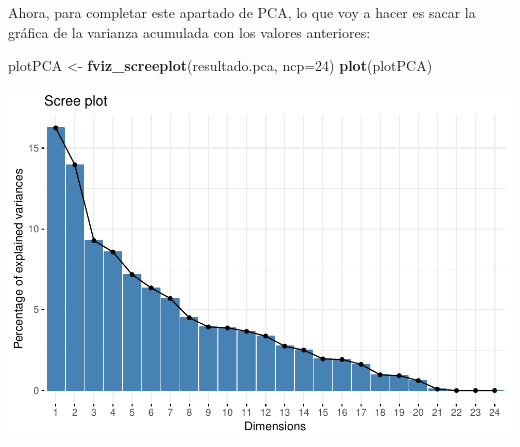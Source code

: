 \documentclass[]{article}
\newenvironment{Shaded}{\begin{snugshade}}{\end{snugshade}}
\newcommand{\CommentTok}[1]{\textcolor[rgb]{0.56,0.35,0.01}{\textit{#1}}}
\newcommand{\DataTypeTok}[1]{\textcolor[rgb]{0.13,0.29,0.53}{#1}}
\newcommand{\DecValTok}[1]{\textcolor[rgb]{0.00,0.00,0.81}{#1}}
\newcommand{\KeywordTok}[1]{\textcolor[rgb]{0.13,0.29,0.53}{\textbf{#1}}}
\newcommand{\NormalTok}[1]{#1}
\newcommand{\OtherTok}[1]{\textcolor[rgb]{0.56,0.35,0.01}{#1}}
\newcommand{\StringTok}[1]{\textcolor[rgb]{0.31,0.60,0.02}{#1}}
\begin{document}
Ahora, para completar este apartado de PCA, lo que voy a hacer es sacar
la gráfica de la varianza acumulada con los valores anteriores:

\begin{Shaded}
\begin{Highlighting}[]
\NormalTok{plotPCA <-}\StringTok{ }\KeywordTok{fviz_screeplot}\NormalTok{(resultado.pca, }\DataTypeTok{ncp=}\DecValTok{24}\NormalTok{)}
\KeywordTok{plot}\NormalTok{(plotPCA)}
\end{Highlighting}
\end{Shaded}

\includegraphics{codigo_files/figure-latex/PCA_eigenvalues_graph-1.pdf}

\begin{Shaded}
\end{Shaded}
\end{document}
